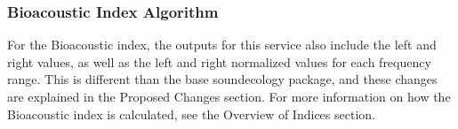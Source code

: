 \subsubsection{Bioacoustic Index Algorithm}
For the Bioacoustic index, the outputs for this service also include the left and right values, as well as the left and right normalized values for each frequency range. This is different than the base soundecology package, and these changes are explained in the Proposed Changes section. For more information on how the Bioacoustic index is calculated, see the Overview of Indices section.
